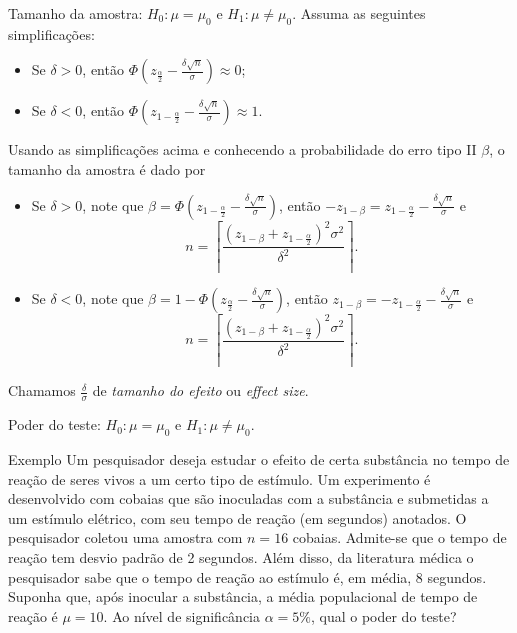 \documentclass[8pt]{beamer}
\begin{document}
\begin{frame}{Tamanho da amostra: $H_0:\mu = \mu_0$ e $H_1: \mu \neq \mu_0$.}
	Assuma as seguintes simplificações:
	\begin{itemize}
		\item Se $\delta > 0$, então $\Phi\left( z_\frac{\alpha}{2} - \frac{\delta \sqrt{n}}{\sigma} \right) \approx 0$;
		\item Se $\delta < 0$, então $\Phi\left( z_{1-\frac{\alpha}{2}} - \frac{\delta \sqrt{n}}{\sigma} \right) \approx 1$.
	\end{itemize}
\vfill

Usando as simplificações acima e conhecendo a probabilidade do erro tipo II $\beta$, o tamanho da amostra é dado por
\begin{itemize}
	\item Se $\delta >0$, note que $\beta = \Phi \left( z_{1-\frac{\alpha}{2}} - \frac{\delta \sqrt{n}}{\sigma} \right)$, então $-z_{1-\beta} = z_{1-\frac{\alpha}{2}} - \frac{\delta \sqrt{n}}{\sigma}$ e
	$$n = \left\lceil \frac{(z_{1-\beta} + z_{1-\frac{\alpha}{2}})^2 \sigma^2}{\delta^2} \right\rceil. $$
	\item Se $\delta < 0$, note que $\beta = 1 - \Phi\left( z_\frac{\alpha}{2} - \frac{\delta\sqrt{n}}{\sigma} \right)$, então $z_{1-\beta} = -z_{1-\frac{\alpha}{2}} - \frac{\delta\sqrt{n}}{\sigma}$ e 
	$$n = \left\lceil \frac{(z_{1-\beta} + z_{1-\frac{\alpha}{2}})^2 \sigma^2}{\delta^2} \right\rceil.$$
\end{itemize}
Chamamos $\frac{\delta}{\sigma}$  de \textit{tamanho do efeito} ou \textit{effect size}.

\end{frame}

\begin{frame}{Poder do teste: $H_0:\mu = \mu_0$ e $H_1: \mu \neq \mu_0$.}

\large

\begin{block}{Exemplo}
	Um pesquisador deseja estudar o efeito de certa substância no tempo de reação de seres vivos a um certo tipo de estímulo. 
	Um experimento é desenvolvido com cobaias que são inoculadas com a substância e submetidas a um estímulo elétrico, com seu tempo de reação (em segundos) anotados. 
	O pesquisador coletou uma amostra com $n=16$ cobaias. Admite-se que o tempo de reação tem desvio padrão de 2 segundos. Além disso, da literatura médica o pesquisador sabe que o tempo de reação ao estímulo é, em média, 8 segundos. Suponha que, após inocular a substância, a média  populacional de tempo de reação é $\mu = 10$. Ao nível de significância $\alpha=5\%$, qual o poder do teste?
\end{block}

\normalsize
\end{frame}
\end{document}
